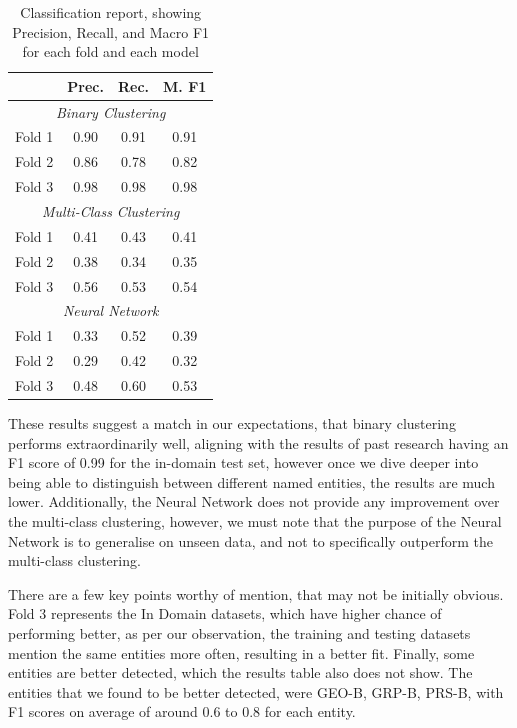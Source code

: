 \documentclass[11pt]{article}
\begin{document}
\begin{table}[H]
  \centering
  \begin{tabular}{|l|c|c|c|}
  \hline
  \textbf{} & \textbf{Prec.} & \textbf{Rec.} & \textbf{M. F1}\\
  \hline
  \multicolumn{4}{|c|}{\textit{Binary Clustering}} \\
  \hline
  Fold 1   & 0.90 & 0.91 & 0.91 \\
  Fold 2   & 0.86 & 0.78 & 0.82 \\
  Fold 3   & 0.98 & 0.98 & 0.98 \\
  \hline
  \multicolumn{4}{|c|}{\textit{Multi-Class Clustering}} \\
  \hline
  Fold 1   & 0.41 & 0.43 & 0.41 \\
  Fold 2   & 0.38 & 0.34 & 0.35 \\
  Fold 3   & 0.56 & 0.53 & 0.54 \\
  \hline
  \multicolumn{4}{|c|}{\textit{Neural Network}} \\
  \hline
  Fold 1   & 0.33 & 0.52 & 0.39 \\
  Fold 2   & 0.29 & 0.42 & 0.32 \\
  Fold 3   & 0.48 & 0.60 & 0.53 \\
  \hline
  \end{tabular}
  \caption{Classification report, showing Precision, Recall, and Macro F1 for each fold and each model}
  \label{tab:Classification-Report}
\end{table}

These results suggest a match in our expectations, that binary clustering performs extraordinarily well, aligning with the results of past
research having an F1 score of 0.99 for the in-domain test set, however once we dive deeper
into being able to distinguish between different named entities, the results are much lower.
Additionally, the Neural Network does not provide any improvement over the multi-class clustering, however,
we must note that the purpose of the Neural Network is to generalise on unseen data, and not to specifically outperform the multi-class clustering.

There are a few key points worthy of mention, that may not be initially obvious.
Fold 3 represents the In Domain datasets, which have higher chance of performing better, as per our observation, the training and testing
datasets mention the same entities more often, resulting in a better fit. Finally, some entities are better detected, which the results table
also does not show. The entities that we found to be better detected, were GEO-B, GRP-B, PRS-B, with F1 scores on average of around 0.6 to 0.8
for each entity.
\end{document}
